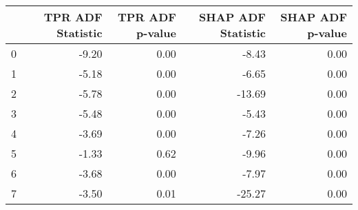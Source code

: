 \begin{tabular}{lrrrr}
\toprule
 & TPR ADF Statistic & TPR ADF p-value & SHAP ADF Statistic & SHAP ADF p-value \\
\midrule
0 & -9.20 & 0.00 & -8.43 & 0.00 \\
1 & -5.18 & 0.00 & -6.65 & 0.00 \\
2 & -5.78 & 0.00 & -13.69 & 0.00 \\
3 & -5.48 & 0.00 & -5.43 & 0.00 \\
4 & -3.69 & 0.00 & -7.26 & 0.00 \\
5 & -1.33 & 0.62 & -9.96 & 0.00 \\
6 & -3.68 & 0.00 & -7.97 & 0.00 \\
7 & -3.50 & 0.01 & -25.27 & 0.00 \\
\bottomrule
\end{tabular}
